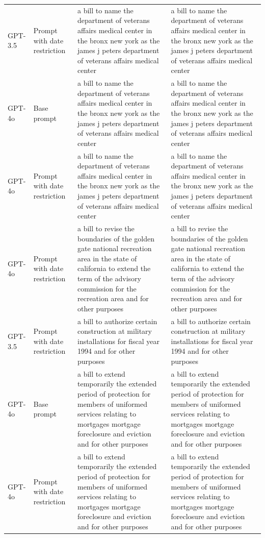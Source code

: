\begin{longtable}{>{\raggedright\arraybackslash}p{1.4cm}>{\raggedright\arraybackslash}p{1.4cm}>{\raggedright\arraybackslash}p{5.5cm}>{\raggedright\arraybackslash}p{5.5cm}}
GPT-3.5 & Prompt with date restriction & a bill to name the department of veterans affairs medical center in the bronx new york as the james j peters department of veterans affairs medical center & a bill to name the department of veterans affairs medical center in the bronx new york as the james j peters department of veterans affairs medical center\\
GPT-4o & Base prompt & a bill to name the department of veterans affairs medical center in the bronx new york as the james j peters department of veterans affairs medical center & a bill to name the department of veterans affairs medical center in the bronx new york as the james j peters department of veterans affairs medical center\\
GPT-4o & Prompt with date restriction & a bill to name the department of veterans affairs medical center in the bronx new york as the james j peters department of veterans affairs medical center & a bill to name the department of veterans affairs medical center in the bronx new york as the james j peters department of veterans affairs medical center\\
GPT-4o & Prompt with date restriction & a bill to revise the boundaries of the golden gate national recreation area in the state of california to extend the term of the advisory commission for the recreation area and for other purposes & a bill to revise the boundaries of the golden gate national recreation area in the state of california to extend the term of the advisory commission for the recreation area and for other purposes\\
GPT-3.5 & Prompt with date restriction & a bill to authorize certain construction at military installations for fiscal year 1994 and for other purposes & a bill to authorize certain construction at military installations for fiscal year 1994 and for other purposes\\
GPT-4o & Base prompt & a bill to extend temporarily the extended period of protection for members of uniformed services relating to mortgages mortgage foreclosure and eviction and for other purposes & a bill to extend temporarily the extended period of protection for members of uniformed services relating to mortgages mortgage foreclosure and eviction and for other purposes\\
GPT-4o & Prompt with date restriction & a bill to extend temporarily the extended period of protection for members of uniformed services relating to mortgages mortgage foreclosure and eviction and for other purposes & a bill to extend temporarily the extended period of protection for members of uniformed services relating to mortgages mortgage foreclosure and eviction and for other purposes\\

\end{longtable}
